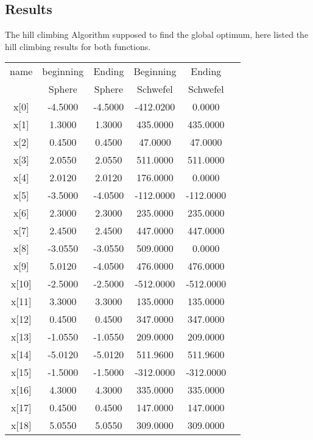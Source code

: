 \documentclass{article}
\begin{document}
\begin{CJK}{UTF8}{gbsn}
\section{Results}
The hill climbing Algorithm supposed to find the global optimum, here listed the hill climbing results for both functions. 

\begin{table}[!hbp]  
\begin{tabular}{|c|c|c|c|c|c|}   
\hline %
\hline %
name        & beginning        & Ending            & Beginning     & Ending \\
            & Sphere           & Sphere             & Schwefel      & Schwefel  \\
\hline
x[0]	&	-4.5000	&	-4.5000	&	-412.0200	&	  0.0000	\\
\hline
x[1]	&	1.3000	&	1.3000	&	435.0000	&	435.0000	\\
\hline
x[2]	&	0.4500	&	0.4500	&	47.0000  	&        47.0000	\\
\hline
x[3]	&	2.0550	&	2.0550	&	511.0000	&	511.0000	\\
\hline
x[4]	&	2.0120	&	2.0120	&	176.0000	&	  0.0000	\\
\hline
x[5]	&	-3.5000	&	-4.0500	&	-112.0000	&      -112.0000	\\
\hline
x[6]	&	2.3000	&	2.3000	&	235.0000	&	235.0000	\\
\hline
x[7]	&	2.4500	&	2.4500	&	447.0000	&	447.0000	\\
\hline
x[8]	&	-3.0550	&	-3.0550	&	509.0000	&	0.0000	\\
\hline
x[9]	&	5.0120	&	-4.0500	&	476.0000	&	476.0000	\\
\hline
x[10]	&	-2.5000	&	-2.5000	&	-512.0000	&	-512.0000	\\
\hline
x[11]	&	3.3000	&	3.3000	&	135.0000	&	135.0000	\\
\hline
x[12]	&	0.4500	&	0.4500	&	347.0000	&	347.0000	\\
\hline
x[13]	&	-1.0550	&	-1.0550	&	209.0000	&	209.0000	\\
\hline
x[14]	&	-5.0120	&	-5.0120	&	511.9600	&	511.9600	\\
\hline
x[15]	&	-1.5000	&	-1.5000	&	-312.0000	&	-312.0000	\\
\hline
x[16]	&	4.3000	&	4.3000	&	335.0000	&	335.0000	\\
\hline
x[17]	&	0.4500	&	0.4500	&	147.0000	&	147.0000	\\
\hline
x[18]	&	5.0550	&	5.0550	&	309.0000	&	309.0000	\\

\end{tabular}
\end{table}
\end{CJK}
\end{document}
